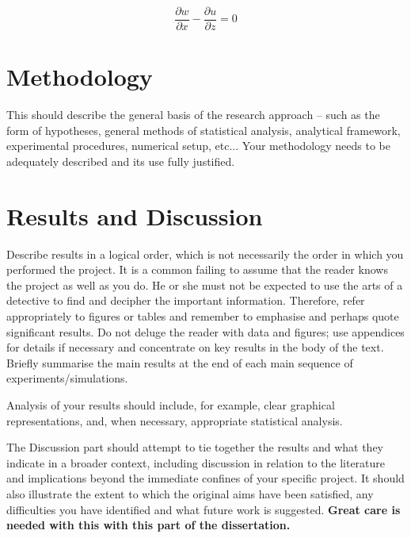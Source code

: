 \documentclass{article}
\begin{document}
\begin{equation}
  \label{eq:irrotationality}
  \frac{\partial w}{\partial x} - \frac{\partial u}{\partial z} = 0
\end{equation}





\section{Methodology}
\label{sec:methodology}


This should describe the general basis of the research approach -- such as the form of hypotheses, general methods of statistical analysis, analytical framework, experimental procedures, numerical setup, etc... Your methodology needs to be adequately described and its use fully justified.





\section{Results and Discussion}
\label{sec:results-discussion}

Describe results in a logical order, which is not necessarily the order in which you performed the project. It is a common failing to assume that the reader knows the project as well as you do. He or she must not be expected to use the arts of a detective to find and decipher the important information. Therefore, refer appropriately to figures or tables and remember to emphasise and perhaps quote significant results. Do not deluge the reader with data and figures; use appendices for details if necessary and concentrate on key results in the body of the text. Briefly summarise the main results at the end of each main sequence of experiments/simulations.

Analysis of your results should include, for example, clear graphical representations, and, when necessary, appropriate statistical analysis.

The Discussion part should attempt to tie together the results and what they indicate in a broader
context, including discussion in relation to the literature and implications beyond the immediate
confines of your specific project. It should also illustrate the extent to which the original aims
have been satisfied, any difficulties you have identified and what future work is suggested.
\textbf{Great care is needed with this with this part of the dissertation.} 
\end{document}
